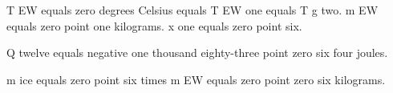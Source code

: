 T EW equals zero degrees Celsius equals T EW one equals T g two.  
m EW equals zero point one kilograms.  
x one equals zero point six.  

Q twelve equals negative one thousand eighty-three point zero six four joules.  

m ice equals zero point six times m EW equals zero point zero six kilograms.